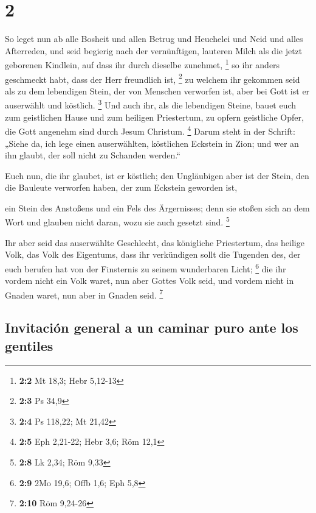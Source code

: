 \hypertarget{section-1}{%
\section{2}\label{section-1}}

 So leget nun ab alle Bosheit und allen Betrug und
Heuchelei und Neid und alles Afterreden,  und seid
begierig nach der vernünftigen, lauteren Milch als die jetzt geborenen
Kindlein, auf dass ihr durch dieselbe zunehmet, \footnote{\textbf{2:2}
  Mt 18,3; Hebr 5,12-13}  so ihr anders geschmeckt habt,
dass der Herr freundlich ist, \footnote{\textbf{2:3} Ps 34,9}
 zu welchem ihr gekommen seid als zu dem lebendigen Stein,
der von Menschen verworfen ist, aber bei Gott ist er auserwählt und
köstlich. \footnote{\textbf{2:4} Ps 118,22; Mt 21,42}  Und
auch ihr, als die lebendigen Steine, bauet euch zum geistlichen Hause
und zum heiligen Priestertum, zu opfern geistliche Opfer, die Gott
angenehm sind durch Jesum Christum. \footnote{\textbf{2:5} Eph 2,21-22;
  Hebr 3,6; Röm 12,1}  Darum steht in der Schrift: „Siehe
da, ich lege einen auserwählten, köstlichen Eckstein in Zion; und wer an
ihn glaubt, der soll nicht zu Schanden werden.``

 Euch nun, die ihr glaubet, ist er köstlich; den
Ungläubigen aber ist der Stein, den die Bauleute verworfen haben, der
zum Eckstein geworden ist,

 ein Stein des Anstoßens und ein Fels des Ärgernisses;
denn sie stoßen sich an dem Wort und glauben nicht daran, wozu sie auch
gesetzt sind. \footnote{\textbf{2:8} Lk 2,34; Röm 9,33}

 Ihr aber seid das auserwählte Geschlecht, das königliche
Priestertum, das heilige Volk, das Volk des Eigentums, dass ihr
verkündigen sollt die Tugenden des, der euch berufen hat von der
Finsternis zu seinem wunderbaren Licht; \footnote{\textbf{2:9} 2Mo 19,6;
  Offb 1,6; Eph 5,8}  die ihr vordem nicht ein Volk
waret, nun aber Gottes Volk seid, und vordem nicht in Gnaden waret, nun
aber in Gnaden seid. \footnote{\textbf{2:10} Röm 9,24-26}

\hypertarget{invitaciuxf3n-general-a-un-caminar-puro-ante-los-gentiles}{%
\subsection{Invitación general a un caminar puro ante los
gentiles}\label{invitaciuxf3n-general-a-un-caminar-puro-ante-los-gentiles}}

